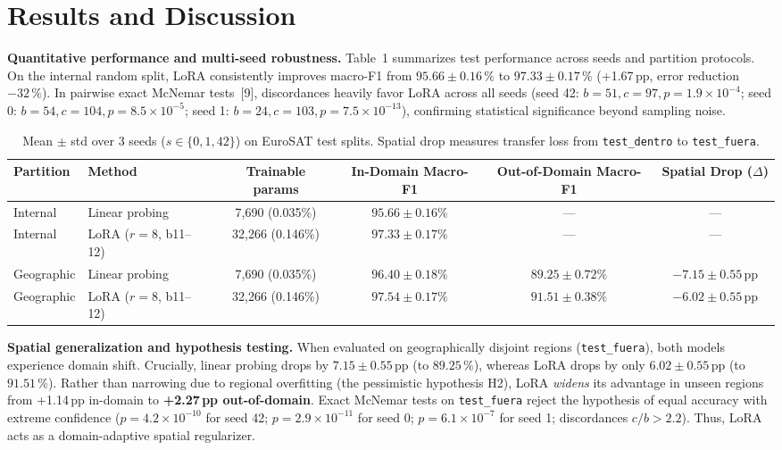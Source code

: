 \documentclass[10pt,a4paper]{article}
\newcommand{\para}[1]{\textbf{#1}\enspace}
\begin{document}
\section{Results and Discussion}
\para{Quantitative performance and multi-seed robustness.} Table~1 summarizes test performance across seeds and partition protocols. On the internal random split, LoRA consistently improves macro-F1 from $95.66 \pm 0.16\,\%$ to $97.33 \pm 0.17\,\%$ (+1.67\,pp, error reduction $-32\,\%$). In pairwise exact McNemar tests~[9], discordances heavily favor LoRA across all seeds (seed 42: $b=51, c=97, p=1.9\times10^{-4}$; seed 0: $b=54, c=104, p=8.5\times10^{-5}$; seed 1: $b=24, c=103, p=7.5\times10^{-13}$), confirming statistical significance beyond sampling noise.

\begin{table}[t]
\centering\small
\begin{tabularx}{\linewidth}{@{}lXcccc@{}}
\toprule
Partition & Method & Trainable params & In-Domain Macro-F1 & Out-of-Domain Macro-F1 & Spatial Drop ($\Delta$) \\
\midrule
Internal & Linear probing & 7,690 (0.035\%) & $95.66 \pm 0.16\%$ & --- & --- \\
Internal & LoRA ($r=8$, b11--12) & 32,266 (0.146\%) & $\mathbf{97.33 \pm 0.17\%}$ & --- & --- \\
\midrule
Geographic & Linear probing & 7,690 (0.035\%) & $96.40 \pm 0.18\%$ & $89.25 \pm 0.72\%$ & $-7.15 \pm 0.55$\,pp \\
Geographic & LoRA ($r=8$, b11--12) & 32,266 (0.146\%) & $\mathbf{97.54 \pm 0.17\%}$ & $\mathbf{91.51 \pm 0.38\%}$ & $\mathbf{-6.02 \pm 0.55}$\,pp \\
\bottomrule
\end{tabularx}
\caption{Mean $\pm$ std over 3 seeds ($s \in \{0, 1, 42\}$) on EuroSAT test splits. Spatial drop measures transfer loss from \texttt{test\_dentro} to \texttt{test\_fuera}.}
\end{table}

\para{Spatial generalization and hypothesis testing.} When evaluated on geographically disjoint regions (\texttt{test\_fuera}), both models experience domain shift. Crucially, linear probing drops by $7.15 \pm 0.55$\,pp (to $89.25\,\%$), whereas LoRA drops by only $6.02 \pm 0.55$\,pp (to $91.51\,\%$). Rather than narrowing due to regional overfitting (the pessimistic hypothesis H2), LoRA \emph{widens} its advantage in unseen regions from +1.14\,pp in-domain to \textbf{+2.27\,pp out-of-domain}. Exact McNemar tests on \texttt{test\_fuera} reject the hypothesis of equal accuracy with extreme confidence ($p = 4.2\times10^{-10}$ for seed 42; $p = 2.9\times10^{-11}$ for seed 0; $p = 6.1\times10^{-7}$ for seed 1; discordances $c/b > 2.2$). Thus, LoRA acts as a domain-adaptive spatial regularizer.
\end{document}

